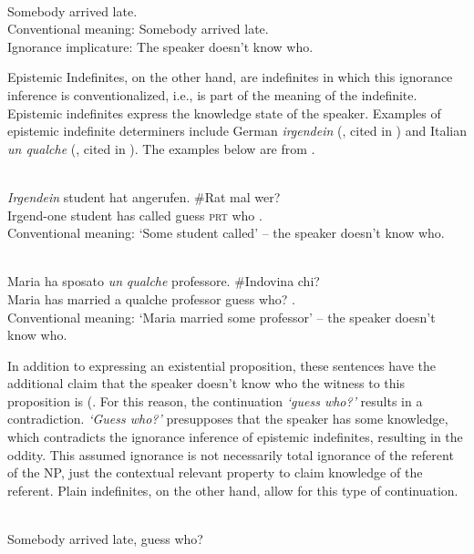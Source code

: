 \documentclass[output=paper,modfonts,nonflat,draftmode]{langsci/langscibook}
\begin{document}
\ea
\ea\label{owusu:ex25}\\
 Somebody arrived late.\\
\ea Conventional meaning: Somebody arrived late.\\
\ex Ignorance implicature: The speaker doesn't know who.
\z \z\z


Epistemic Indefinites, on the other hand, are indefinites in which this ignorance inference is conventionalized, i.e., is part of the meaning of the indefinite. Epistemic indefinites express the knowledge state of the speaker. Examples of epistemic indefinite determiners include German \emph{irgendein} (\citealt{Haspelmath1997,Kratzer2002a}, cited in \citealt{AloniPort2015}) and Italian \emph{un qualche}  (\citealt{Zamparelli2007}, cited in \citealt{AloniPort2015}). The examples below are from \citet{AloniPort2015}.

\ea\label{owusu:ex26}\\
 \gll\emph{Irgendein} student hat angerufen. \#Rat mal wer?  \\
     Irgend-one student has called guess \textsc{prt} who .\\
\glt Conventional meaning: `Some student called' – the speaker doesn’t know who.

\ex \label{owusu:ex28}\\
\gll Maria ha sposato \emph{un} \emph{qualche} professore. \#Indovina chi? \\
      Maria has married a qualche professor guess who? .\\
\glt Conventional meaning: `Maria married some professor' – the speaker doesn’t know who.
\z 

In addition to expressing an existential proposition, these sentences have the additional claim that the speaker doesn't know who the witness to this proposition is (\citet{AloniPort2015}. For this reason, the continuation \emph{`guess who?'} results in a contradiction. \emph{`Guess who?'} presupposes that the speaker has some knowledge, which contradicts the ignorance inference of epistemic indefinites, resulting in the oddity.  This assumed ignorance is not necessarily total ignorance of the referent of the NP,  just the contextual relevant property to claim knowledge of the referent. Plain indefinites, on the other hand, allow for this type of continuation.

  \ea\label{owusu:ex26:2}\\
 Somebody arrived late, guess who?
 \z 
 
\end{document}
